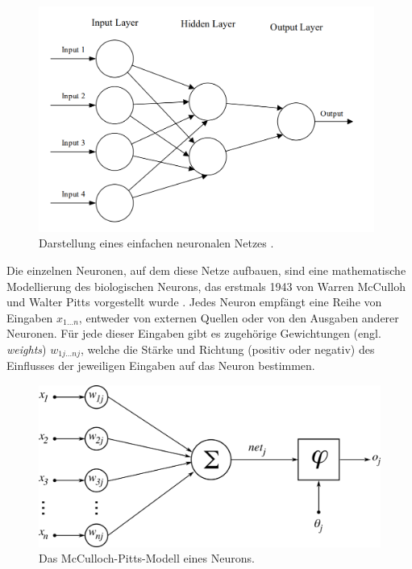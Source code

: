 \begin{figure}[]
	\centering
	\includegraphics[width=11cm]{figure_ffn.png}
	\caption{Darstellung eines einfachen neuronalen Netzes \parencite{oshea2015cnnintro}.}
	\label{fig:ffn}
\end{figure}

Die einzelnen Neuronen, auf dem diese Netze aufbauen, sind eine mathematische Modellierung des biologischen Neurons, das erstmals 1943 von Warren McCulloh und Walter Pitts vorgestellt wurde \parencite{Zhou2021machinelearning}. Jedes Neuron empfängt eine Reihe von Eingaben $x_{1 \dots n}$, entweder von externen Quellen oder von den Ausgaben anderer Neuronen. Für jede dieser Eingaben gibt es zugehörige Gewichtungen (engl. \textit{weights}) $w_{1j \dots nj}$, welche die Stärke und Richtung (positiv oder negativ) des Einflusses der jeweiligen Eingaben auf das Neuron bestimmen.

\begin{figure}[h]
	\centering
	\vspace*{4mm}
	\includegraphics[width=12cm]{figure_mp-neuron_nd.png} %
	\vspace*{2mm}
	\caption{Das McCulloch-Pitts-Modell eines Neurons.}
	\label{fig:neuron}
\end{figure}

